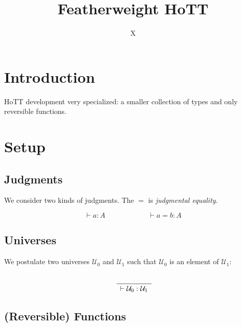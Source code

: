 \documentclass[format=acmlarge,review,natbib]{acmart}
\newcommand{\uzero}{\mathcal{U}_0}
\newcommand{\uone}{\mathcal{U}_1}
\newcommand{\Rule}[2]{
\makebox{
$\displaystyle
\frac{\begin{array}{l}#1\\\end{array}}
{\begin{array}{l}#2\\\end{array}}$}}
\newcommand{\proves}{\vdash}
\newcommand{\jdg}[3]{#1 \proves #2 : #3}
\begin{document}
\title{Featherweight HoTT}

\author{X}

\begin{abstract}
\end{abstract}

\maketitle

\section{Introduction}

HoTT development very specialized: a smaller collection of types and only
reversible functions.

\section{Setup}

\subsection{Judgments}

We consider two kinds of judgments. The $=$ is \emph{judgmental equality}.

\[
\jdg{}{a}{A} \qquad\qquad\qquad \jdg{}{a = b}{A}
\]

\subsection{Universes}

We postulate two universes $\uzero$ and $\uone$ such that $\uzero$ is an element
of $\uone$:

\[
\Rule{}{\jdg{}{\uzero}{\uone}}
\]

\subsection{(Reversible) Functions}
\end{document}
